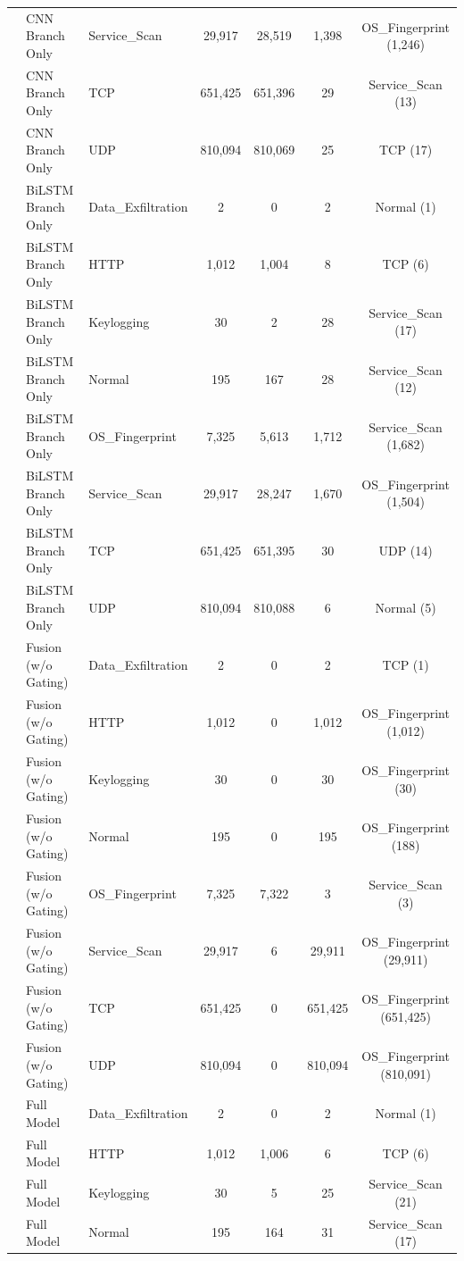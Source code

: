 \documentclass[a4paper,fleqn]{cas-sc}
\begin{document}
\begin{landscape}
\begin{longtable}{lllcccc}
 & CNN Branch Only & Service\_Scan & 29,917 & 28,519 & 1,398 & OS\_Fingerprint (1,246) \\
 & CNN Branch Only & TCP & 651,425 & 651,396 & 29 & Service\_Scan (13) \\
 & CNN Branch Only & UDP & 810,094 & 810,069 & 25 & TCP (17) \\
 & BiLSTM Branch Only & Data\_Exfiltration & 2 & 0 & 2 & Normal (1) \\
 & BiLSTM Branch Only & HTTP & 1,012 & 1,004 & 8 & TCP (6) \\
 & BiLSTM Branch Only & Keylogging & 30 & 2 & 28 & Service\_Scan (17) \\
 & BiLSTM Branch Only & Normal & 195 & 167 & 28 & Service\_Scan (12) \\
 & BiLSTM Branch Only & OS\_Fingerprint & 7,325 & 5,613 & 1,712 & Service\_Scan (1,682) \\
 & BiLSTM Branch Only & Service\_Scan & 29,917 & 28,247 & 1,670 & OS\_Fingerprint (1,504) \\
 & BiLSTM Branch Only & TCP & 651,425 & 651,395 & 30 & UDP (14) \\
 & BiLSTM Branch Only & UDP & 810,094 & 810,088 & 6 & Normal (5) \\
 & Fusion (w/o Gating) & Data\_Exfiltration & 2 & 0 & 2 & TCP (1) \\
 & Fusion (w/o Gating) & HTTP & 1,012 & 0 & 1,012 & OS\_Fingerprint (1,012) \\
 & Fusion (w/o Gating) & Keylogging & 30 & 0 & 30 & OS\_Fingerprint (30) \\
 & Fusion (w/o Gating) & Normal & 195 & 0 & 195 & OS\_Fingerprint (188) \\
 & Fusion (w/o Gating) & OS\_Fingerprint & 7,325 & 7,322 & 3 & Service\_Scan (3) \\
 & Fusion (w/o Gating) & Service\_Scan & 29,917 & 6 & 29,911 & OS\_Fingerprint (29,911) \\
 & Fusion (w/o Gating) & TCP & 651,425 & 0 & 651,425 & OS\_Fingerprint (651,425) \\
 & Fusion (w/o Gating) & UDP & 810,094 & 0 & 810,094 & OS\_Fingerprint (810,091) \\
 & Full Model & Data\_Exfiltration & 2 & 0 & 2 & Normal (1) \\
 & Full Model & HTTP & 1,012 & 1,006 & 6 & TCP (6) \\
 & Full Model & Keylogging & 30 & 5 & 25 & Service\_Scan (21) \\
 & Full Model & Normal & 195 & 164 & 31 & Service\_Scan (17) \\

\end{longtable}
\end{landscape}
\end{document}
